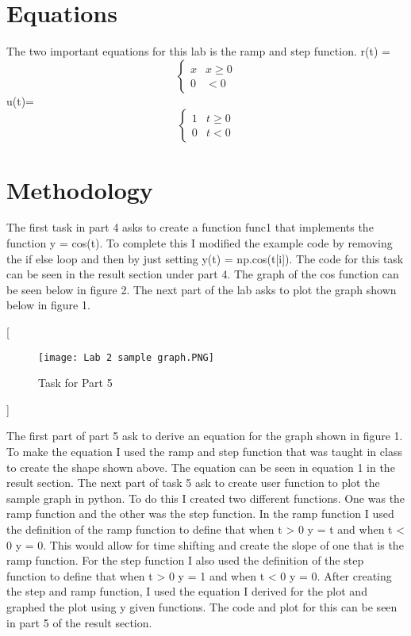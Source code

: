 \documentclass[11pt,a4]{report}
\begin{document}
\section{Equations}
The two important equations for this lab is the ramp and step function.
\newline
\newline
 r(t) =
\[ \begin{cases} 
      x & x\geq 0 \\
      0 & < 0 
   \end{cases}
\]
\newline
u(t)=
\[ \begin{cases} 
      1 & t\geq 0 \\
      0 & t <  0 
   \end{cases}
\]
\section{Methodology}
The first task in part 4 asks to create a function func1 that implements the function y = cos(t). To complete this I modified the example code by removing the if else loop and then by just setting y(t) = np.cos(t[i]). The code for this task can be seen in the result section under part 4. The graph of the cos function can be seen below in figure 2. The next part of the lab asks to plot the graph shown below in figure 1.

[
\begin{figure}[h!]
    \begin{center}
  \caption{Task for Part 5}
  \texttt{[image: Lab 2 sample graph.PNG]}
\end{center}
\end{figure} ]
\newpage

The first part of part 5 ask to derive an equation for the graph shown in figure 1. To make the equation I used the ramp and step function that was taught in class to create the shape shown above. The equation can be seen in equation 1 in the result section. The next part of task 5 ask to create user function to plot the sample graph in python. To do this I created two different functions. One was the ramp function and the other was the step function. In the ramp function I used the definition of the ramp function to define that when t > 0 y = t and when t < 0 y = 0. This would allow for time shifting and create the slope of one that is the ramp function. For the step function I also used the definition of the step function to define that when t > 0 y = 1 and when t < 0 y = 0. After creating the step and ramp function, I used the equation I derived for the plot and graphed the plot using y given functions. The code and plot for this can be seen in part 5 of the result section. 
\end{document}
